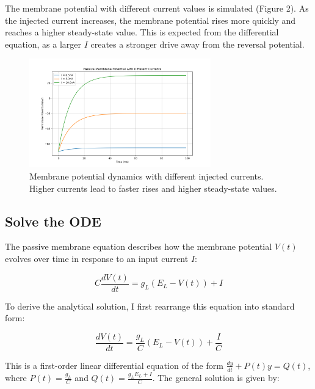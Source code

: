 \documentclass[11pt,a4paper]{article}
\begin{document}
The membrane potential with different current values is simulated (Figure 2). As the injected current increases, the membrane potential rises more quickly and reaches a higher steady-state value. This is expected from the differential equation, as a larger $I$ creates a stronger drive away from the reversal potential.

\begin{figure}[H]
\centering
\includegraphics[width=0.7\textwidth]{fig2.png}
\caption{Membrane potential dynamics with different injected currents. Higher currents lead to faster rises and higher steady-state values.}
\label{fig:current_variation}
\end{figure}

\subsection{Solve the ODE}

The passive membrane equation describes how the membrane potential $V(t)$ evolves over time in response to an input current $I$:

\begin{equation}
C \frac{dV(t)}{dt} = g_L(E_L - V(t)) + I
\end{equation}

To derive the analytical solution, I first rearrange this equation into standard form:

\begin{equation}
\frac{dV(t)}{dt} = \frac{g_L}{C}(E_L - V(t)) + \frac{I}{C}
\end{equation}

This is a first-order linear differential equation of the form $\frac{dy}{dt} + P(t)y = Q(t)$, where $P(t) = \frac{g_L}{C}$ and $Q(t) = \frac{g_L E_L + I}{C}$. The general solution is given by:
\end{document}
